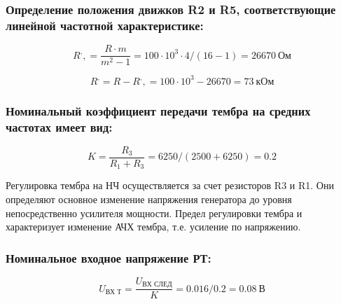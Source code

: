 \subsubsection{ Определение положения движков R2 и R5, соответствующие линейной частотной характеристике:}

  \begin{equation}
  \label{eq:equation5_12}
  R^,,=\dfrac{R \cdot m}{m^2-1}=100 \cdot 10^3 \cdot  4/(16-1)=26670~\text{Ом}
  \end{equation}

  \begin{equation}
  \label{eq:equation5_13}
  R^,=R-R^,,=100 \cdot 10^3 -26670=73~\text{кОм}
  \end{equation}

  \subsubsection{ Номинальный коэффициент передачи тембра на средних частотах имеет вид:}
   
  \begin{equation}
  \label{eq:equation5_14}
   K=\dfrac {R_3}{R_1+R_3}=6250/(2500+6250)=0.2
  \end{equation}

  Регулировка тембра на НЧ осуществляется за счет резисторов R3 и R1. Они определяют основное изменение напряжения генератора до уровня непосредственно усилителя мощности. Предел регулировки тембра и характеризует изменение АЧХ тембра, т.е. усиление по напряжению.

  \subsubsection{  Номинальное входное напряжение РТ:}

  \begin{equation}
  \label{eq:equation5_12}
   U_{\text{ВХ Т}}=\dfrac{U_{\text{ВХ СЛЕД}}}{K}=0.016/0.2=0.08~\text{В}
  \end{equation}


   